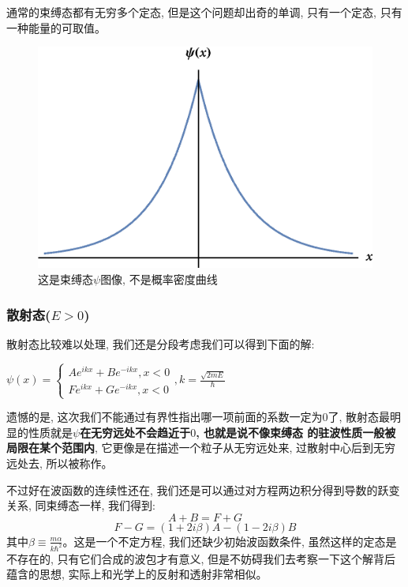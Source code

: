 \documentclass[a4paper,zihao=-4,linespread=1]{ctexrep}
\begin{document}
    通常的束缚态都有无穷多个定态, 但是这个问题却出奇的单调, 只有一个定态, 只有一种能量的可取值。
    \begin{figure}[htbp]
        \centering
        \includegraphics[scale=0.5]{fig/2-5-2.eps}
        \caption{这是束缚态$\psi$图像, 不是概率密度曲线}
    \end{figure}
    \subsubsection*{散射态($E>0$)}
    散射态比较难以处理, 我们还是分段考虑我们可以得到下面的解:
    \begin{center}
        \begin{math}
            \displaystyle
            \psi(x)=
            \begin{cases}
                Ae^{ikx}+Be^{-ikx},x<0\\
                Fe^{ikx}+Ge^{-ikx},x<0
            \end{cases}
            ,k=\frac{\sqrt{2mE}}{\hbar}
        \end{math}
    \end{center}
    遗憾的是, 这次我们不能通过有界性指出哪一项前面的系数一定为$0$了, 散射态最明显的性质就是\textbf{$\psi$在无穷远处不会趋近于$0$, 也就是说不像束缚态
    的驻波性质一般被局限在某个范围内}, 它更像是在描述一个粒子从无穷远处来, 过散射中心后到无穷远处去, 所以被称作。

    不过好在波函数的连续性还在, 我们还是可以通过对方程两边积分得到导数的跃变关系, 同束缚态一样, 我们得到:
    $$A+B=F+G$$ $$F-G=(1+2i\beta)A-(1-2i\beta)B$$其中$\beta\equiv\frac{m\alpha}{k\hbar^2}$。这是一个不定方程, 我们还缺少初始波函数条件, 虽然这样的定态是
    不存在的, 只有它们合成的波包才有意义, 但是不妨碍我们去考察一下这个解背后蕴含的思想, 实际上和光学上的反射和透射非常相似。
    
\end{document}
